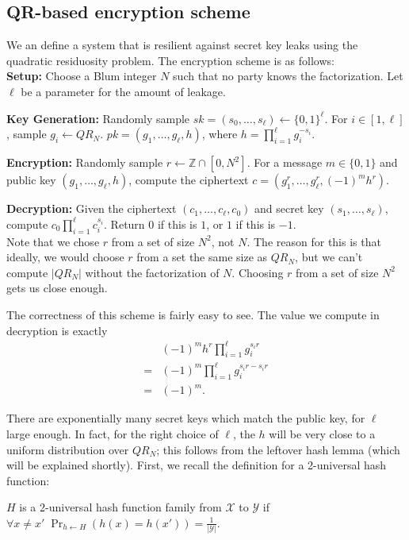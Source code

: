 \documentclass[10pt]{article}
\newcommand{\bit}{\{0,1\}}
\begin{document}
\subsection{QR-based encryption scheme \cite{Brakerski2010}}

We an define a system that is resilient against secret key leaks using the quadratic residuosity problem. The encryption scheme is as follows:
\\

\textbf{Setup:} Choose a Blum integer $N$ such that no party knows the factorization. Let $\ell$ be a parameter for the amount of leakage.

\textbf{Key Generation:} Randomly sample  $sk = (s_0,\dots,s_\ell) \leftarrow \{0,1\}^\ell$. For $i \in [1,\ell]$, sample $g_i \leftarrow QR_N$. $pk = (g_1,\dots,g_\ell,h)$, where $h = \prod_{i=1}^\ell g_i^{-s_i}$.

\textbf{Encryption:} Randomly sample $r \leftarrow \mathbb{Z} \cap [0,N^2]$. For a message $m \in \bit$ and public key $(g_1,\dots,g_\ell,h)$, compute the ciphertext $c = (g_1^r,\dots,g_\ell^r,(-1)^m h^r)$. 

\textbf{Decryption:} Given the ciphertext $(c_1,\dots,c_\ell,c_0)$ and secret key $(s_1,\dots,s_\ell)$, compute $c_0 \prod_{i=1}^\ell c_i^{s_i}$. Return $0$ if this is $1$, or $1$ if this is $-1$.
\\

Note that we chose $r$ from a set of size $N^2$, not $N$. The reason for this is that ideally, we would choose $r$ from a set the same size as $QR_N$, but we can't compute $|QR_N|$ without the factorization of $N$. Choosing $r$ from a set of size $N^2$ gets us close enough.

The correctness of this scheme is fairly easy to see. The value we compute in decryption is exactly 
\begin{align*}
&(-1)^m h^r \prod_{i=1}^\ell g_i^{s_i r}
\\ = &(-1)^m \prod_{i=1}^\ell g_i^{s_i r - s_i r}
\\ = &(-1)^m.
\end{align*}

There are exponentially many secret keys which match the public key, for $\ell$ large enough. In fact, for the right choice of $\ell$, the $h$ will be very close to a uniform distribution over $QR_N$; this follows from the leftover hash lemma (which will be explained shortly). First, we recall the definition for a 2-universal hash function:

\begin{definition}
$H$ is a 2-universal hash function family from $\mathcal{X}$ to $ \mathcal{Y}$ if $\forall x \neq x' \; \Pr_{h \leftarrow H}(h(x) = h(x')) = \frac{1}{|\mathcal{Y}|}$.
\end{definition}
\end{document}
